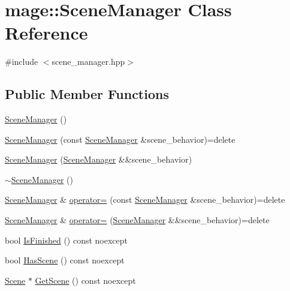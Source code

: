 \hypertarget{classmage_1_1_scene_manager}{}\section{mage\+:\+:Scene\+Manager Class Reference}
\label{classmage_1_1_scene_manager}


{\ttfamily \#include $<$scene\+\_\+manager.\+hpp$>$}

\subsection*{Public Member Functions}
\begin{DoxyCompactItemize}
\item 
\hyperlink{classmage_1_1_scene_manager_a25a1185ca41db52d046a5901b301a0be}{Scene\+Manager} ()
\item 
\hyperlink{classmage_1_1_scene_manager_a450ce8e4d52483a2dcc3bb090f565373}{Scene\+Manager} (const \hyperlink{classmage_1_1_scene_manager}{Scene\+Manager} \&scene\+\_\+behavior)=delete
\item 
\hyperlink{classmage_1_1_scene_manager_ae8f4c6553e27b0bc00f0ea40f0e3770c}{Scene\+Manager} (\hyperlink{classmage_1_1_scene_manager}{Scene\+Manager} \&\&scene\+\_\+behavior)
\item 
\hyperlink{classmage_1_1_scene_manager_a849386b052d6ae8945c9554f888e1707}{$\sim$\+Scene\+Manager} ()
\item 
\hyperlink{classmage_1_1_scene_manager}{Scene\+Manager} \& \hyperlink{classmage_1_1_scene_manager_a90c17a35f737879fa07acb28f6d787af}{operator=} (const \hyperlink{classmage_1_1_scene_manager}{Scene\+Manager} \&scene\+\_\+behavior)=delete
\item 
\hyperlink{classmage_1_1_scene_manager}{Scene\+Manager} \& \hyperlink{classmage_1_1_scene_manager_a5f2e494edeb329e54a928a1bc0f5f7df}{operator=} (\hyperlink{classmage_1_1_scene_manager}{Scene\+Manager} \&\&scene\+\_\+behavior)=delete
\item 
bool \hyperlink{classmage_1_1_scene_manager_adeb1fd1d9f40229ccb0ef8adfb55f4cc}{Is\+Finished} () const noexcept
\item 
bool \hyperlink{classmage_1_1_scene_manager_ac767593112ea1d8b47cc79283cf7c47e}{Has\+Scene} () const noexcept
\item 
\hyperlink{classmage_1_1_scene}{Scene} $\ast$ \hyperlink{classmage_1_1_scene_manager_a55d720c9f90cfc46dbf07d46537072c1}{Get\+Scene} () const noexcept
\item 

\end{DoxyCompactItemize}
